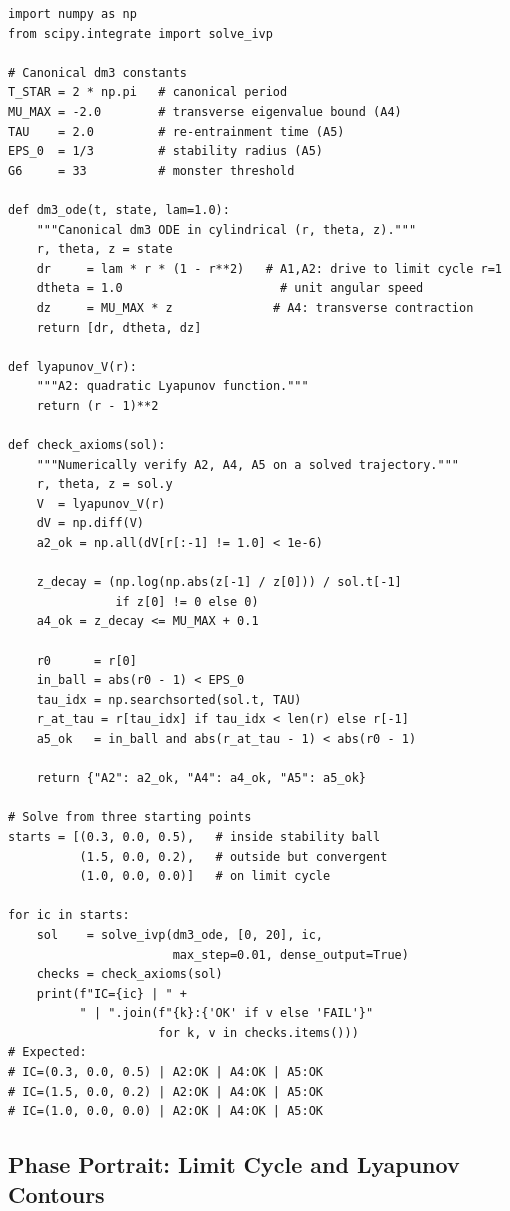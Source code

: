 \documentclass[11pt, a4paper]{article}
\theoremstyle{definition}
\begin{document}
\begin{lstlisting}[language=Python3, caption={Canonical dm$^3$ ODE and axiom verification}, label={lst:dm3-ode}]
import numpy as np
from scipy.integrate import solve_ivp

# Canonical dm3 constants
T_STAR = 2 * np.pi   # canonical period
MU_MAX = -2.0        # transverse eigenvalue bound (A4)
TAU    = 2.0         # re-entrainment time (A5)
EPS_0  = 1/3         # stability radius (A5)
G6     = 33          # monster threshold

def dm3_ode(t, state, lam=1.0):
    """Canonical dm3 ODE in cylindrical (r, theta, z)."""
    r, theta, z = state
    dr     = lam * r * (1 - r**2)   # A1,A2: drive to limit cycle r=1
    dtheta = 1.0                      # unit angular speed
    dz     = MU_MAX * z              # A4: transverse contraction
    return [dr, dtheta, dz]

def lyapunov_V(r):
    """A2: quadratic Lyapunov function."""
    return (r - 1)**2

def check_axioms(sol):
    """Numerically verify A2, A4, A5 on a solved trajectory."""
    r, theta, z = sol.y
    V  = lyapunov_V(r)
    dV = np.diff(V)
    a2_ok = np.all(dV[r[:-1] != 1.0] < 1e-6)

    z_decay = (np.log(np.abs(z[-1] / z[0])) / sol.t[-1]
               if z[0] != 0 else 0)
    a4_ok = z_decay <= MU_MAX + 0.1

    r0      = r[0]
    in_ball = abs(r0 - 1) < EPS_0
    tau_idx = np.searchsorted(sol.t, TAU)
    r_at_tau = r[tau_idx] if tau_idx < len(r) else r[-1]
    a5_ok   = in_ball and abs(r_at_tau - 1) < abs(r0 - 1)

    return {"A2": a2_ok, "A4": a4_ok, "A5": a5_ok}

# Solve from three starting points
starts = [(0.3, 0.0, 0.5),   # inside stability ball
          (1.5, 0.0, 0.2),   # outside but convergent
          (1.0, 0.0, 0.0)]   # on limit cycle

for ic in starts:
    sol    = solve_ivp(dm3_ode, [0, 20], ic,
                       max_step=0.01, dense_output=True)
    checks = check_axioms(sol)
    print(f"IC={ic} | " +
          " | ".join(f"{k}:{'OK' if v else 'FAIL'}"
                     for k, v in checks.items()))
# Expected:
# IC=(0.3, 0.0, 0.5) | A2:OK | A4:OK | A5:OK
# IC=(1.5, 0.0, 0.2) | A2:OK | A4:OK | A5:OK
# IC=(1.0, 0.0, 0.0) | A2:OK | A4:OK | A5:OK
\end{lstlisting}

\subsection{Phase Portrait: Limit Cycle and Lyapunov Contours}
\end{document}
